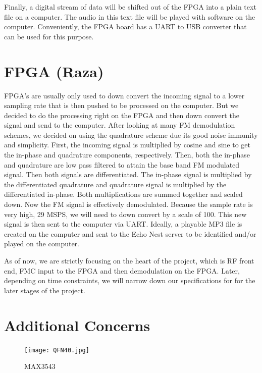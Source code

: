 \documentclass[a4paper, 12pt]{article}
\begin{document}
Finally, a digital stream of data will be shifted out of the FPGA into a plain text file on a computer.  The audio in this text file will be played with software on the computer.  Conveniently, the FPGA board has a UART to USB converter that can be used for this purpose.

\section{FPGA (Raza)}
FPGA’s are usually only used to down convert the incoming signal to a lower sampling rate that is then pushed to be processed on the computer. But we decided to do the processing right on the FPGA and then down convert the signal and send to the computer. After looking at many FM demodulation schemes, we decided on using the quadrature scheme due its good noise immunity and simplicity. First, the incoming signal is multiplied by cosine and sine to get the in-phase and quadrature components, respectively. Then, both the in-phase and quadrature are low pass filtered to attain the base band FM modulated signal. Then both signals are differentiated. The in-phase signal is multiplied by the differentiated quadrature and quadrature signal is multiplied by the differentiated in-phase. Both multiplications are summed together and scaled down. Now the FM signal is effectively demodulated. Because the sample rate is very high, 29 MSPS, we will need to down convert by a scale of 100. This new signal is then sent to the computer via UART. Ideally, a playable MP3 file is created on the computer and sent to the Echo Nest server to be identified and/or played on the computer.

As of now, we are strictly focusing on the heart of the project, which is RF front end, FMC input to the FPGA and then demodulation on the FPGA. Later, depending on time constraints, we will narrow down our specifications for for the later stages of the project.

\section{Additional Concerns}

\begin{figure}
\begin{center}
  \texttt{[image: QFN40.jpg]}
\end{center}

\caption{MAX3543}
\label{fig:qfn40}
\end{figure}
\end{document}
